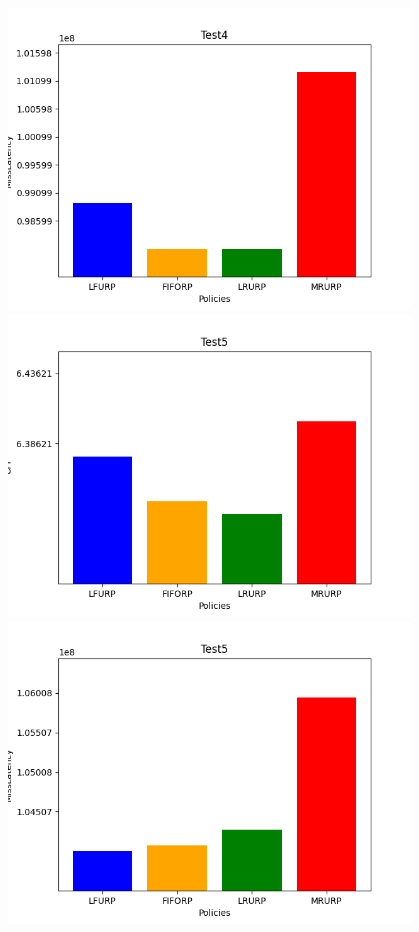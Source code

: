 ‫\includegraphics[width=0.8\textwidth]{graph/csv4Miss.png}\\
‫\includegraphics[width=0.8\textwidth]{graph/csv5CPI.png}\\
‫\includegraphics[width=0.8\textwidth]{graph/csv5Miss.png}\\
